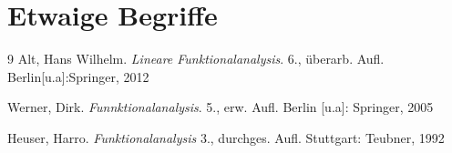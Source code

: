 \documentclass[ngerman]{report}
\begin{document}
\listoftodos
\tableofcontents
\listoftheorems

\clearpage
\setcounter{page}{1}







\appendix 

\chapter{Etwaige Begriffe}

\glsaddall
\printnoidxglossary



\begin{thebibliography}[alpha]{9}
		Alt, Hans Wilhelm.
		\textit{Lineare Funktionalanalysis}.
		6., überarb. Aufl.
		Berlin[u.a]:Springer, 2012

		Werner, Dirk.
		\textit{Funnktionalanalysis}.
		5., erw. Aufl.
		Berlin [u.a]: Springer, 2005

		Heuser, Harro.
		\textit{Funktionalanalysis}
		3., durchges. Aufl. 
		Stuttgart: Teubner, 1992
\end{thebibliography}
\end{document}
